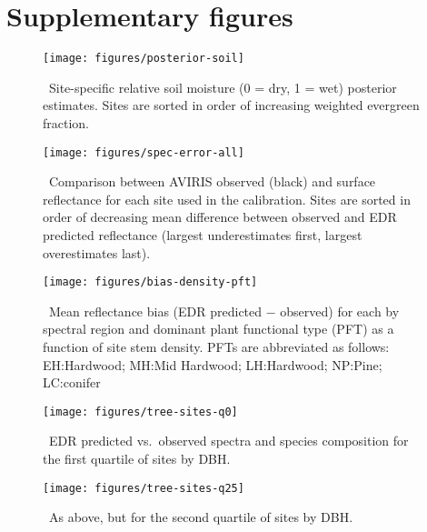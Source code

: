 \section{Supplementary figures}

\begin{figure}[ht]
  \centering
  \texttt{[image: figures/posterior-soil]}
  \caption{\label{fig:posterior-soil}\
    Site-specific relative soil moisture (0 = dry, 1 = wet) posterior estimates.
    Sites are sorted in order of increasing weighted evergreen fraction.
  }
\end{figure}

\clearpage

\begin{figure}
  \centering
  \texttt{[image: figures/spec-error-all]}
  \caption{\label{fig:spec-error-allsites}\
    Comparison between AVIRIS observed (black) and
    surface reflectance for each site used in the calibration.
    Sites are sorted in order of decreasing mean difference between observed and EDR predicted reflectance
    (largest underestimates first, largest overestimates last).
  }
\end{figure}

\clearpage

\begin{figure}
  \centering
  \texttt{[image: figures/bias-density-pft]}
  \caption{\label{fig:bias-density-pft}\
    Mean reflectance bias (EDR predicted $-$ observed) for each by spectral region and dominant plant functional type (PFT) as a function of site stem density.
    PFTs are abbreviated as follows:
    EH:\@Early Hardwood;
    MH:\@North Mid Hardwood;
    LH:\@Late Hardwood;
    NP:\@Northern Pine;
    LC:\@Late conifer
  }
\end{figure}

\clearpage

\begin{figure}[ht]
  \centering
  \texttt{[image: figures/tree-sites-q0]}
  \caption{\label{fig:tree-sites-q0}\
    EDR predicted vs.\ observed spectra and species composition for the first quartile of sites by DBH.\@
  }
\end{figure}

\clearpage

\begin{figure}[ht]
  \centering
  \texttt{[image: figures/tree-sites-q25]}
  \caption{\label{fig:tree-sites-q25}\
    As above, but for the second quartile of sites by DBH.\@
  }
\end{figure}

